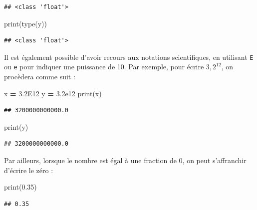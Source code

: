 \documentclass[
  12pt,
]{book}
\newenvironment{Shaded}{\begin{snugshade}}{\end{snugshade}}
\newcommand{\BuiltInTok}[1]{#1}
\newcommand{\FloatTok}[1]{\textcolor[rgb]{0.00,0.00,0.81}{#1}}
\newcommand{\NormalTok}[1]{#1}
\newcommand{\OperatorTok}[1]{\textcolor[rgb]{0.81,0.36,0.00}{\textbf{#1}}}
\numberwithin{equation}{section}
\numberwithin{countremarque}{section}
\begin{document}
\begin{lstlisting}
## <class 'float'>
\end{lstlisting}

\begin{Shaded}
\begin{Highlighting}[]
\BuiltInTok{print}\NormalTok{(}\BuiltInTok{type}\NormalTok{(y))}
\end{Highlighting}
\end{Shaded}

\begin{lstlisting}
## <class 'float'>
\end{lstlisting}

Il est également possible d'avoir recours aux notations scientifiques, en utilisant \texttt{E} ou \texttt{e} pour indiquer une puissance de 10. Par exemple, pour écrire \(3,2^{12}\), on procèdera comme suit :

\begin{Shaded}
\begin{Highlighting}[]
\NormalTok{x }\OperatorTok{=} \FloatTok{3.2E12}
\NormalTok{y }\OperatorTok{=} \FloatTok{3.2e12}
\BuiltInTok{print}\NormalTok{(x)}
\end{Highlighting}
\end{Shaded}

\begin{lstlisting}
## 3200000000000.0
\end{lstlisting}

\begin{Shaded}
\begin{Highlighting}[]
\BuiltInTok{print}\NormalTok{(y)}
\end{Highlighting}
\end{Shaded}

\begin{lstlisting}
## 3200000000000.0
\end{lstlisting}

Par ailleurs, lorsque le nombre est égal à une fraction de 0, on peut s'affranchir d'écrire le zéro :

\begin{Shaded}
\begin{Highlighting}[]
\BuiltInTok{print}\NormalTok{(}\FloatTok{0.35}\NormalTok{)}
\end{Highlighting}
\end{Shaded}

\begin{lstlisting}
## 0.35
\end{lstlisting}
\end{document}
